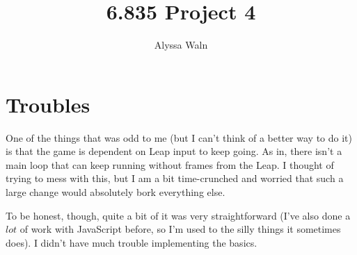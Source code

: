 \documentclass[12pt]{article}
\title{\textbf{6.835 Project 4}}
\author{Alyssa Waln}
\begin{document}
\maketitle

\section*{Troubles} One of the things that was odd to me (but I can't think of a better way to do it) is that the game is dependent on Leap input to keep going. As in, there isn't a main loop that can keep running without frames from the Leap. I thought of trying to mess with this, but I am a bit time-crunched and worried that such a large change would absolutely bork everything else.
\par To be honest, though, quite a bit of it was very straightforward (I've also done a $lot$ of work with JavaScript before, so I'm used to the silly things it sometimes does). I didn't have much trouble implementing the basics.
\end{document}
